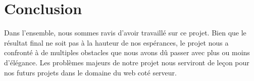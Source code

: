 \documentclass{article}
\begin{document}
    \section{Conclusion}
    Dans l'ensemble, nous sommes ravis d'avoir travaillé sur ce projet. Bien que le résultat final ne soit pas à la hauteur de nos espérances,
    le projet nous a confronté à de multiples obstacles que nous avons dû passer avec plus ou moins d'élégance. Les problèmes majeurs de
    notre projet nous serviront de leçon pour nos futurs projets dans le domaine du web coté serveur.
    
\end{document}
